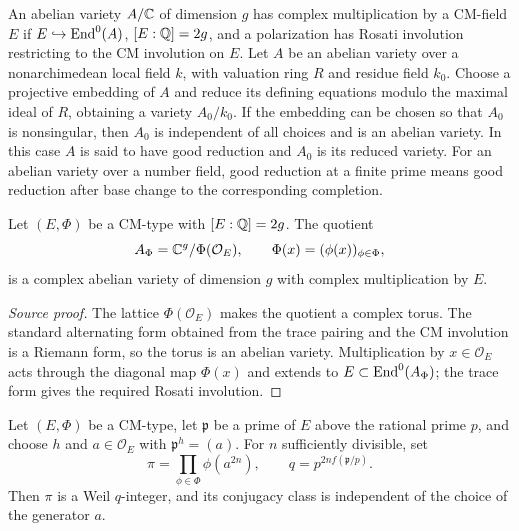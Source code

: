\begin{definition}\label{def:milne-cm-good-reduction}
An abelian variety $A/\mathbb{C}$ of dimension $g$ has complex multiplication by a
CM-field $E$ if $E\hookrightarrow\operatorname{End}^0(A)$, $[E:\mathbb{Q}]=2g$, and a polarization
has Rosati involution restricting to the CM involution on $E$. Let $A$ be an
abelian variety over a nonarchimedean local field $k$, with valuation ring
$R$ and residue field $k_0$. Choose a projective embedding of $A$ and reduce
its defining equations modulo the maximal ideal of $R$, obtaining a variety
$A_0/k_0$. If the embedding can be chosen so that $A_0$ is nonsingular, then
$A_0$ is independent of all choices and is an abelian variety. In this case
$A$ is said to have good reduction and $A_0$ is its reduced variety. For an
abelian variety over a number field, good reduction at a finite prime means
good reduction after base change to the corresponding completion.
\end{definition}

\begin{proposition}\label{prop:milne-cm-type-construction}
Let $(E,\Phi)$ be a CM-type with $[E:\mathbb{Q}]=2g$. The quotient
\[
 A_\Phi=\mathbb{C}^g/\Phi(\mathcal O_E),\qquad
 \Phi(x)=(\phi(x))_{\phi\in\Phi},
\]
is a complex abelian variety of dimension $g$ with complex multiplication by
$E$.
\end{proposition}

\begin{proof}[Source proof]
The lattice $\Phi(\mathcal O_E)$ makes the quotient a complex torus. The
standard alternating form obtained from the trace pairing and the CM
involution is a Riemann form, so the torus is an abelian variety. Multiplication
by $x\in\mathcal O_E$ acts through the diagonal map $\Phi(x)$ and extends to
$E\subset\operatorname{End}^0(A_\Phi)$; the trace form gives the required Rosati involution.
\end{proof}

\begin{proposition}\label{prop:milne-cm-weil-integer}
Let $(E,\Phi)$ be a CM-type, let $\mathfrak p$ be a prime of $E$ above the
rational prime $p$, and choose $h$ and $a\in\mathcal O_E$ with
$\mathfrak p^h=(a)$. For $n$ sufficiently divisible, set
\[
 \pi=\prod_{\phi\in\Phi}\phi(a^{2n}),
 \qquad q=p^{2nf(\mathfrak p/p)}.
\]
Then $\pi$ is a Weil $q$-integer, and its conjugacy class is independent of
the choice of the generator $a$.
\end{proposition}

